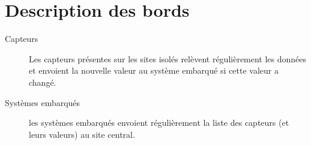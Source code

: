 \section{Description des bords}

\begin{description}
	\item[Capteurs]
		Les capteurs présentes sur les sites isolés relèvent régulièrement les données et envoient la nouvelle valeur au système embarqué si cette valeur a changé.
	\item[Systèmes embarqués]
	les systèmes embarqués envoient régulièrement la liste des capteurs (et leurs valeurs) au site central.


\end{description}
